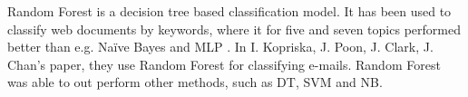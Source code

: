 Random Forest is a decision tree based classification model. It has been used to classify web documents by keywords, where it for five and seven topics performed better than e.g. Naïve Bayes and MLP \cite{keywords}. In I. Kopriska, J. Poon, J. Clark, J. Chan's paper, they use Random Forest for classifying e-mails. Random Forest was able to out perform other methods, such as DT, SVM and NB\cite{email}.